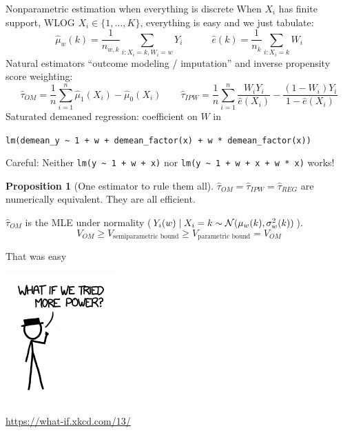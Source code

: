 \documentclass[10pt,aspectratio=169,handout]{beamer}
\theoremstyle{definition}
\newtheorem{prop}{Proposition}
\begin{document}
\begin{frame}{Nonparametric estimation when everything is discrete}
\small
  When $X_i$ has finite support, WLOG $X_i \in \{1,\ldots,K\}$, everything
  is easy and we just tabulate: \[
  \hat \mu_w(k) = \frac{1}{n_{w,k}}\sum_{i: X_i=k, W_i=w} Y_i
  \quad\quad\quad \hat e
  (k) = \frac{1}{n_k}\sum_{i:X_i = k}  W_i
  \]
Natural estimators ``\alert{outcome modeling / imputation}'' and 
\alert{inverse
propensity
score weighting}:
\[
\hat \tau_{OM} = \frac{1}{n}\sum_{i=1}^n \hat \mu_1(X_i) - \hat \mu_0 (X_i)
\qquad \hat \tau_{IPW} = \frac{1}{n}\sum_{i=1}^n \frac{W_i Y_i}{\hat e(X_i)} - 
\frac{(1-W_i) Y_i}{1-\hat e(X_i)}
\]
\alert{Saturated demeaned regression}: coefficient on $W$ in  

\texttt{lm(demean\_y \textasciitilde{} 1 + w + demean\_factor(x) + 
\alert{w *
demean\_factor(x))}}

\hfill{\footnotesize\alert{Careful: Neither \texttt{lm(y \textasciitilde{}
1 + w +
x)} nor \texttt{lm(y
\textasciitilde{}
1 + w + x + w * x)} works!}}

\begin{prop}[One estimator to rule them all]
  $\hat\tau_{OM} = \hat\tau_{IPW} = \hat\tau_{REG}$ are numerically
  equivalent. They are all efficient.
  
  $\hat \tau_{OM}$ is the MLE under normality
  ($Y_i(w) \mid X_i = k \sim \mathcal{N}(\mu_{w}(k), \sigma^2_
  {w}(k))$). 
  \[
  V_{OM} \ge V_{\text{semiparametric bound}} \ge V_{\text{parametric
  bound}} =
  V_{OM}
  \]
\end{prop}
\end{frame}

\begin{frame}{That was easy}
\begin{center}
  \includegraphics[height=0.5\textheight]{laser_pointer_more_power.png}
  
  \url{https://what-if.xkcd.com/13/}
\end{center}
  
\end{frame}
\end{document}
